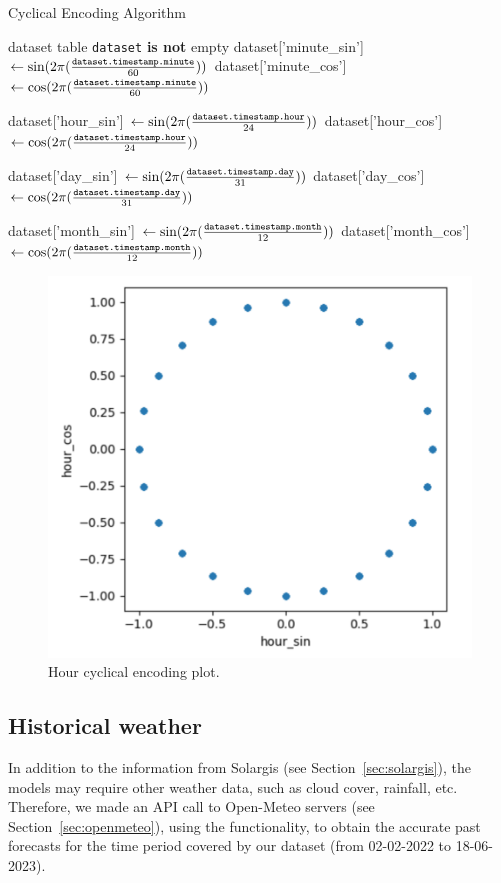 \begin{algorithm}[H]
	\caption{Cyclical Encoding Algorithm}\label{alg:cyclicencoding}
	\begin{algorithmic}
		\Require dataset table
		\Ensure \texttt{dataset} \textbf{is not} empty
		\State dataset['minute\_sin'] $\gets \sin(2 \pi (\frac{\text{\texttt{dataset.timestamp.minute}}}{60}))$
		\State dataset['minute\_cos'] $\gets \cos(2 \pi (\frac{\text{\texttt{dataset.timestamp.minute}}}{60}))$


		\State dataset['hour\_sin'] $\gets \sin(2 \pi (\frac{\text{\texttt{dataset.timestamp.hour}}}{24}))$
		\State dataset['hour\_cos'] $\gets \cos(2 \pi (\frac{\text{\texttt{dataset.timestamp.hour}}}{24}))$


		\State dataset['day\_sin'] $\gets \sin(2 \pi (\frac{\text{\texttt{dataset.timestamp.day}}}{31}))$
		\State dataset['day\_cos'] $\gets \cos(2 \pi (\frac{\text{\texttt{dataset.timestamp.day}}}{31}))$

		\State dataset['month\_sin'] $\gets \sin(2 \pi (\frac{\text{\texttt{dataset.timestamp.month}}}{12}))$
		\State dataset['month\_cos'] $\gets \cos(2 \pi (\frac{\text{\texttt{dataset.timestamp.month}}}{12}))$
	\end{algorithmic}
\end{algorithm}

\begin{figure}[H]
	\centering
	\includegraphics[width=0.7\linewidth, keepaspectratio]{chapters/2_data_preprocessing/imgs/hoursincosplot.png}
	\caption{Hour cyclical encoding plot.}\label{fig:encodingplot}
\end{figure}

\subsection{Historical weather}
In addition to the information from Solargis (see Section~\ref{sec:solargis}),
the models may require other weather data, such as cloud cover, rainfall, etc.
Therefore, we made an API call to Open-Meteo servers (see Section~\ref{sec:openmeteo}), using the  functionality, to obtain the accurate past
forecasts for the time period covered by our dataset (from 02-02-2022 to 18-06-2023).

